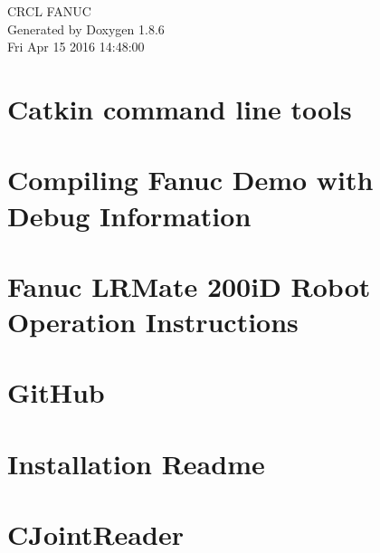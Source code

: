 \documentclass[twoside]{book}
\newcommand{\clearemptydoublepage}{%
  \newpage{\pagestyle{empty}\cleardoublepage}%
}
\begin{document}
\hypersetup{pageanchor=false}
\begin{titlepage}
\vspace*{7cm}
\begin{center}%
{\Large C\-R\-C\-L F\-A\-N\-U\-C }\\
\vspace*{1cm}
{\large Generated by Doxygen 1.8.6}\\
\vspace*{0.5cm}
{\small Fri Apr 15 2016 14:48:00}\\
\end{center}
\end{titlepage}
\clearemptydoublepage
\tableofcontents
\clearemptydoublepage
{}
\hypersetup{pageanchor=true}

\chapter{Catkin command line tools}
\label{md_markdown_catkin}
\hypertarget{md_markdown_catkin}{}

\chapter{Compiling Fanuc Demo with Debug Information}
\label{md_markdown_Catkin_make_tips}
\hypertarget{md_markdown_Catkin_make_tips}{}

\chapter{Fanuc L\-R\-Mate 200i\-D Robot Operation Instructions}
\label{md_markdown_FanucRobotOperationInstructions}
\hypertarget{md_markdown_FanucRobotOperationInstructions}{}

\chapter{Git\-Hub}
\label{md_markdown_githubnotes}
\hypertarget{md_markdown_githubnotes}{}

\chapter{Installation Readme}
\label{md_markdown_Installation}
\hypertarget{md_markdown_Installation}{}

\chapter{C\-Joint\-Reader}
\label{md_markdown_JointReader}
\hypertarget{md_markdown_JointReader}{}

\end{document}
